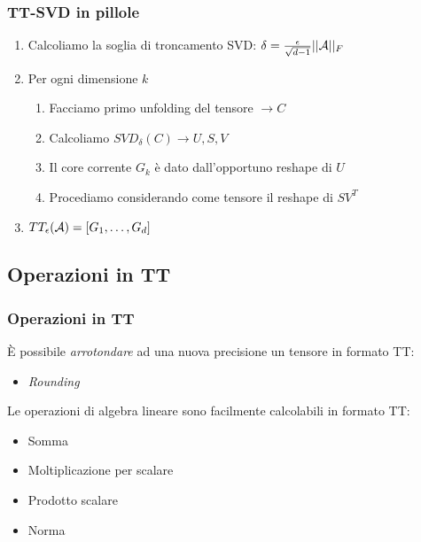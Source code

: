 \documentclass[compress]{beamer}
\newcommand{\nota}[1]{\textcolor{red}{#1}}
\theoremstyle{definition}
\theoremstyle{plain}
\begin{document}
\begin{frame}
\frametitle{TT-SVD in pillole}
\begin{enumerate}
	\item Calcoliamo la soglia di troncamento SVD: $\delta = \frac{\epsilon}{\sqrt{d-1}} ||\mathcal{A}||_F$
	\item Per ogni dimensione $k$
		\begin{enumerate}
			\item Facciamo primo unfolding del tensore $\rightarrow C$
			\item Calcoliamo $SVD_{\delta}(C) \rightarrow U,S,V$
			\item Il core corrente $G_k$ è dato dall'opportuno reshape di $U$
			\item Procediamo considerando come tensore il reshape di $SV^T$
		\end{enumerate}
	\item $TT_{\epsilon}(\mathcal{A}) = [G_1, \ldots, G_d]$
\end{enumerate}
\end{frame}

\subsection{Operazioni in TT}
\begin{frame}
\frametitle{Operazioni in TT}
\`E possibile \emph{arrotondare} ad una nuova precisione un tensore in formato TT:
\begin{itemize}
	\item \emph{Rounding}
\end{itemize}

\pause
\vspace{3mm}
Le operazioni di algebra lineare sono facilmente calcolabili in formato TT:
\begin{itemize}
\item Somma
\item Moltiplicazione per scalare
\item Prodotto scalare
\item Norma
\end{itemize}
\end{frame}
\end{document}
